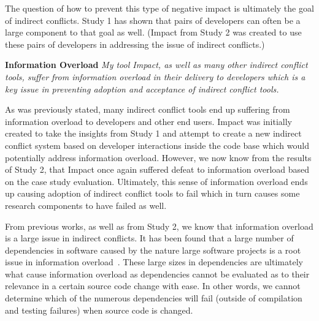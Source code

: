 The question of how to prevent this type of negative impact is ultimately the goal of indirect conflicts. Study 1 has
shown that pairs of developers can often be a large component to that goal as well. (Impact from Study 2 was
created to use these pairs of developers in addressing the issue of indirect conflicts.) 

\textbf{Information Overload} \textit{My tool Impact, as well as many other indirect conflict tools, suffer from
information overload in their delivery to developers which is a key issue in preventing adoption and acceptance
of indirect conflict tools.}

As was previously stated, many indirect conflict tools end up suffering from information overload to developers
and other end users. Impact was initially created to take the insights from Study 1 and attempt to create
a new indirect conflict system based on developer interactions inside the code base which would potentially address
information overload. However, we now know from the results of Study 2, that Impact once again suffered defeat to information
overload based on the case study evaluation. Ultimately, this sense of information overload ends up causing
adoption of indirect conflict tools to fail which in turn causes some research components to have failed as
well.

From previous works, as well as from Study 2, we know that information overload is a large issue in indirect
conflicts. It has been found that a large number of dependencies in software caused by the nature large software
projects is a root issue in information overload~\cite{Sarma:2007:TSA,Servant:2010:CPI}. These large sizes in
dependencies are ultimately what cause information overload as dependencies cannot be evaluated as to their
relevance in a certain source code change with ease. In other words, we cannot determine which of the numerous
dependencies will fail (outside of compilation and testing failures) when source code is changed.

